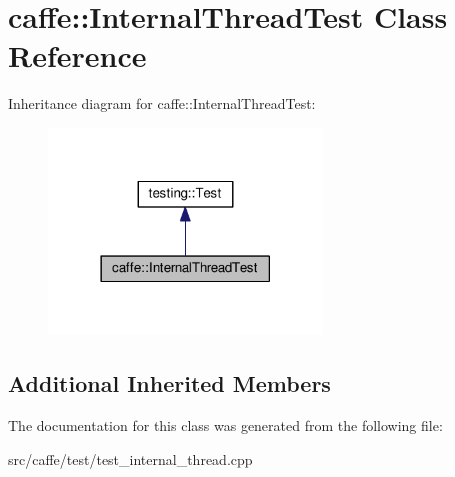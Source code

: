 \hypertarget{classcaffe_1_1_internal_thread_test}{}\section{caffe\+:\+:Internal\+Thread\+Test Class Reference}
\label{classcaffe_1_1_internal_thread_test}


Inheritance diagram for caffe\+:\+:Internal\+Thread\+Test\+:
\nopagebreak
\begin{figure}[H]
\begin{center}
\leavevmode
\includegraphics[width=206pt]{classcaffe_1_1_internal_thread_test__inherit__graph}
\end{center}
\end{figure}
\subsection*{Additional Inherited Members}


The documentation for this class was generated from the following file\+:\begin{DoxyCompactItemize}
\item 
src/caffe/test/test\+\_\+internal\+\_\+thread.\+cpp\end{DoxyCompactItemize}
